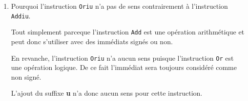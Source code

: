 \begin{enumerate}
\begin{correction}
      \`A noter que l'instruction \texttt{Nori Rt, Rs, I} peut
      \^etre effectu\'ee via les instructions suivantes:

      \begin{verbatim}
        Addiu Rd, R0, I
        Nor Rd, Rs, Rt
      \end{verbatim}

    \end{correction}
  \item
    Pourquoi l'instruction \texttt{Oriu} n'a pas de sens contrairement
    \`a l'instruction \texttt{Addiu}.

    \begin{correction}

      Tout simplement parceque l'instruction \texttt{Add} est une
      op\'eration arithm\'etique et peut donc s'utiliser avec des
      imm\'ediats sign\'es ou non.

      En revanche, l'instruction \texttt{Oriu} n'a aucun sens puisque
      l'instruction \texttt{Or} est une op\'eration logique. De ce fait
      l'imm\'ediat sera toujours consid\'er\'e comme non sign\'e.

      L'ajout du suffixe \textbf{u} n'a donc aucun sens pour cette instruction.

    \end{correction}
\end{enumerate}


